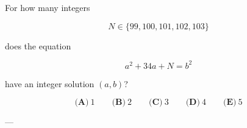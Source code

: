 For how many integers



\[
N\in\{99,100,101,102,103\}
\]

does the equation



\[
a^2+34a+N=b^2
\]

have an integer solution \((a,b)\)?



\[
\textbf{(A)}\ 1
\qquad
\textbf{(B)}\ 2
\qquad
\textbf{(C)}\ 3
\qquad
\textbf{(D)}\ 4
\qquad
\textbf{(E)}\ 5
\]

---

